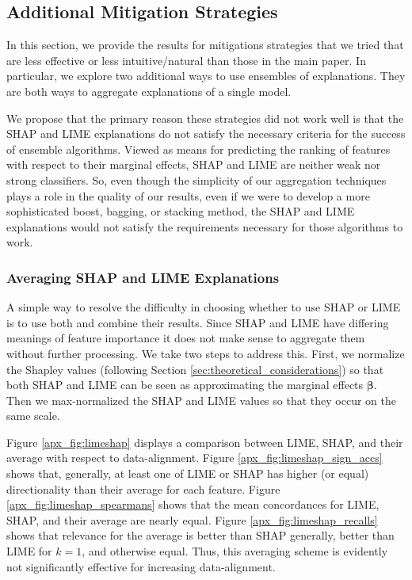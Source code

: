 \documentclass[mnsc,blindrev]{informs3}
\begin{document}
    
    
    
  
    \subsection{Additional Mitigation Strategies}
        \label{apx_sec:additional_mitigations}
        In this section, we provide the results for mitigations strategies that we tried that are less effective or less intuitive/natural than those in the main paper. In particular, we explore two additional ways to use ensembles of explanations. They are both ways to aggregate explanations of a single model. 
        
        We propose that the primary reason these strategies did not work well is that the SHAP and LIME explanations do not satisfy the necessary criteria for the success of ensemble algorithms. Viewed as means for predicting the ranking of features with respect to their marginal effects, SHAP and LIME are neither weak nor strong classifiers. So, even though the simplicity of our aggregation techniques plays a role in the quality of our results, even if we were to develop a more sophisticated boost, bagging, or stacking method, the SHAP and LIME explanations would not satisfy the requirements necessary for those algorithms to work. %

            \subsubsection{Averaging SHAP and LIME Explanations}
            A simple way to resolve the difficulty in choosing whether to use SHAP or LIME is to use both and combine their results. Since SHAP and LIME have differing meanings of feature importance it does not make sense to aggregate them without further processing. We take two steps to address this. First, we normalize the Shapley values (following Section \ref{sec:theoretical_considerations}) so that both SHAP and LIME can be seen as approximating the marginal effects $\boldsymbol{\beta}$. Then we max-normalized the SHAP and LIME values so that they occur on the same scale. 

            Figure \ref{apx_fig:limeshap} displays a comparison between LIME, SHAP, and their average with respect to data-alignment. Figure \ref{apx_fig:limeshap_sign_accs} shows that, generally, at least one of LIME or SHAP has higher (or equal) directionality than their average for each feature. Figure \ref{apx_fig:limeshap_spearmans} shows that the mean concordances for LIME, SHAP, and their average are nearly equal. Figure \ref{apx_fig:limeshap_recalls} shows that relevance for the average is better than SHAP generally, better than LIME for $k=1$, and otherwise equal. Thus, this averaging scheme is evidently not significantly effective for increasing data-alignment. 
\end{document}
